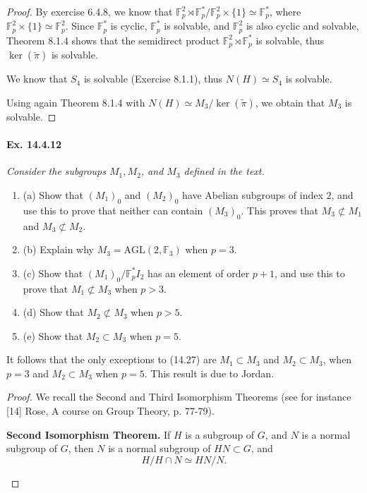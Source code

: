 \documentclass[11pt,a4paper]{article}
\newcommand{\be} {\begin{enumerate}}
\newcommand{\ee} {\end{enumerate}}
\newcommand{\F}{\mathbb{F}}
\begin{document}
{\begin{proof}
By exercise 6.4.8, we know that $\F_p^2 \rtimes \F_p^*/ \F_p^2\times \{1\} \simeq \F_p^*$, where $\F_p^2 \times \{1\} \simeq \F_p^2$. Since $\F_p^*$ is cyclic, $\F_p^*$ is solvable, and $\F_p^2$ is also cyclic and solvable, Theorem 8.1.4 shows that the semidirect product $\F_p^2 \rtimes \F_p^*$ is solvable, thus $\ker(\tilde \pi)$ is solvable.

We know that $S_4$ is solvable (Exercise 8.1.1), thus $N(H) \simeq S_4$ is solvable.

Using again Theorem 8.1.4 with $N(H) \simeq M_3/ \ker(\tilde{\pi})$, we obtain that $M_3$ is solvable.

\end{proof}


\paragraph{Ex. 14.4.12}{\it Consider the subgroups $M_1,M_2$, and $M_3$ defined in the text.
\be
\item[(a)] Show that $(M_1)_0$ and $(M_2)_0$ have Abelian subgroups of index $2$, and use this to prove that neither can contain $(M_3)_0$. This proves that $M_3 \not \subset M_1$ and $M_3 \not \subset M_2$.
\item[(b)] Explain why $M_3 = \mathrm{AGL}(2,\F_3)$ when $p = 3$.
\item[(c)] Show that $(M_1)_0/\F_p^* I_2$ has an element of order $p+1$, and use this to prove that $M_1 \not \subset M_3$ when $p>3$.
\item[(d)] Show that $M_2 \not \subset M_3$ when $p>5$.
\item[(e)] Show that $M_2 \subset M_3$ when $p=5$.
\ee
It follows that the only exceptions to (14.27) are $M_1 \subset M_3$ and $M_2 \subset M_3$, when $p=3$ and $M_2 \subset M_3$ when $p=5$. This result is due to Jordan.
}

\begin{proof} We recall the Second and Third Isomorphism Theorems (see for instance [14] Rose, A course on Group Theory, p.  77-79).

\bigskip

{\bf Second Isomorphism Theorem.} If $H$ is a subgroup of $G$, and $N$ is a normal subgroup of $G$, then $N$ is a normal subgroup of $HN \subset G$, and
$$H/H\cap N \simeq HN/N.$$
\begin{center}
\end{center}


\end{proof}}
\end{document}
